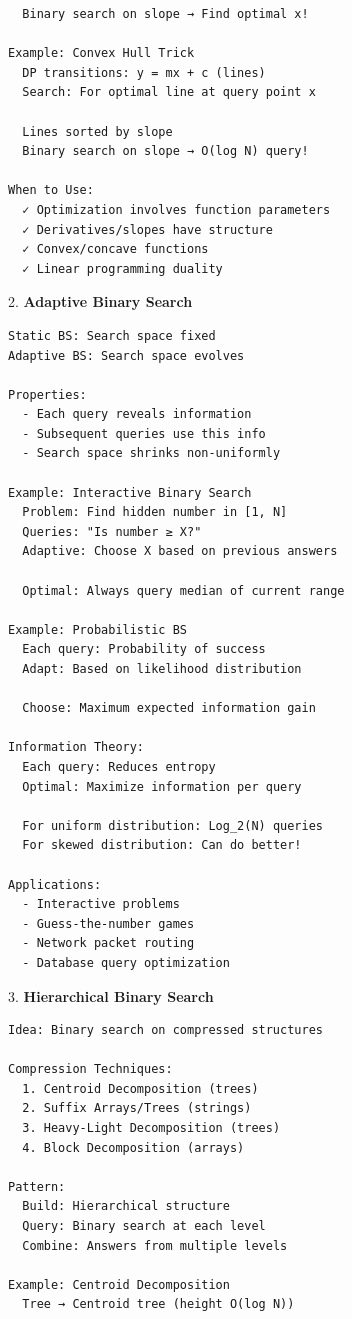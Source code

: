 \documentclass[11pt,a4paper,oneside]{book}
\begin{document}
\begin{tcolorbox}[
    enhanced,breakable,
    colback=white,
    colframe=deepblue,
    boxrule=1.5pt,
    arc=3mm,
    title=\textbf{Beyond Traditional Binary Search}
]
\begin{verbatim}
  Binary search on slope → Find optimal x!

Example: Convex Hull Trick
  DP transitions: y = mx + c (lines)
  Search: For optimal line at query point x
  
  Lines sorted by slope
  Binary search on slope → O(log N) query!

When to Use:
  ✓ Optimization involves function parameters
  ✓ Derivatives/slopes have structure
  ✓ Convex/concave functions
  ✓ Linear programming duality
\end{verbatim}

2. \textbf{Adaptive Binary Search}
\begin{verbatim}
Static BS: Search space fixed
Adaptive BS: Search space evolves

Properties:
  - Each query reveals information
  - Subsequent queries use this info
  - Search space shrinks non-uniformly

Example: Interactive Binary Search
  Problem: Find hidden number in [1, N]
  Queries: "Is number ≥ X?"
  Adaptive: Choose X based on previous answers
  
  Optimal: Always query median of current range

Example: Probabilistic BS
  Each query: Probability of success
  Adapt: Based on likelihood distribution
  
  Choose: Maximum expected information gain

Information Theory:
  Each query: Reduces entropy
  Optimal: Maximize information per query
  
  For uniform distribution: Log_2(N) queries
  For skewed distribution: Can do better!

Applications:
  - Interactive problems
  - Guess-the-number games
  - Network packet routing
  - Database query optimization
\end{verbatim}

3. \textbf{Hierarchical Binary Search}
\begin{verbatim}
Idea: Binary search on compressed structures

Compression Techniques:
  1. Centroid Decomposition (trees)
  2. Suffix Arrays/Trees (strings)
  3. Heavy-Light Decomposition (trees)
  4. Block Decomposition (arrays)

Pattern:
  Build: Hierarchical structure
  Query: Binary search at each level
  Combine: Answers from multiple levels

Example: Centroid Decomposition
  Tree → Centroid tree (height O(log N))
  

\end{verbatim}
\end{tcolorbox}
\end{document}
